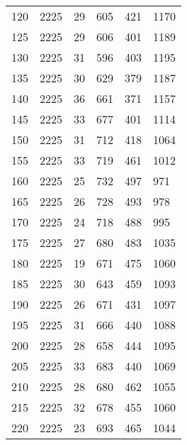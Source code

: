 \begin{longtable}{|l|l|l|l|l|l|}
120 & 2225 & 29 & 605 & 421 & 1170 \\
125 & 2225 & 29 & 606 & 401 & 1189 \\
130 & 2225 & 31 & 596 & 403 & 1195 \\
135 & 2225 & 30 & 629 & 379 & 1187 \\
140 & 2225 & 36 & 661 & 371 & 1157 \\
145 & 2225 & 33 & 677 & 401 & 1114 \\
150 & 2225 & 31 & 712 & 418 & 1064 \\
155 & 2225 & 33 & 719 & 461 & 1012 \\
160 & 2225 & 25 & 732 & 497 & 971 \\
165 & 2225 & 26 & 728 & 493 & 978 \\
170 & 2225 & 24 & 718 & 488 & 995 \\
175 & 2225 & 27 & 680 & 483 & 1035 \\
180 & 2225 & 19 & 671 & 475 & 1060 \\
185 & 2225 & 30 & 643 & 459 & 1093 \\
190 & 2225 & 26 & 671 & 431 & 1097 \\
195 & 2225 & 31 & 666 & 440 & 1088 \\
200 & 2225 & 28 & 658 & 444 & 1095 \\
205 & 2225 & 33 & 683 & 440 & 1069 \\
210 & 2225 & 28 & 680 & 462 & 1055 \\
215 & 2225 & 32 & 678 & 455 & 1060 \\
220 & 2225 & 23 & 693 & 465 & 1044 \\

	\bottomrule
\end{longtable}